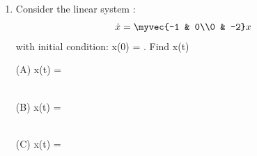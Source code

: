\begin{enumerate}[label=\thesubsection.\arabic*.,ref=\thesubsection.\theenumi]

\item  Consider the linear system :
\begin{align}
    \dot{x} = \myvec{-1 & 0\\0 & -2}x
\end{align}
with initial condition:  
x(0) = . Find x(t)


(A) x(t) =

\\

(B) x(t) =

\\

(C) x(t) =

\\


\end{enumerate}
